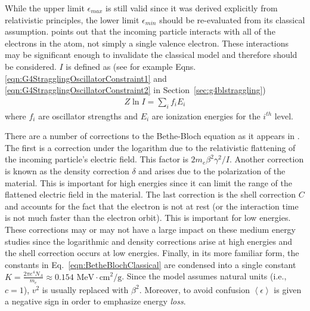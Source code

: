 While the upper limit $\epsilon_{max}$ is still valid since it was derived explicitly from relativistic principles, the lower limit $\epsilon_{min}$ should be re-evaluated from its classical assumption. \cite{bichsel1968} points out that the incoming particle interacts with all of the electrons in the atom, not simply a single valence electron. These interactions may be significant enough to invalidate the classical model and therefore should be considered. $I$ is defined as (see for example Eqns. \ref{eqn:G4StragglingOscillatorConstraint1} and \ref{eqn:G4StragglingOscillatorConstraint2} in Section~\ref{sec:g4blstraggling})
\begin{gather*}
Z \ln I = \sum_i f_i E_i
\end{gather*}
where $f_i$ are oscillator strengths and $E_i$ are ionization energies for the $i^{th}$ level.
\fi

There are a number of corrections to the Bethe-Bloch equation as it appears in \cite{cosy}. The first is a correction under the logarithm due to the relativistic flattening of the incoming particle's electric field. This factor is  $2m_e \beta^2 \gamma^2 / I$\cite{cosy}. Another correction is known as the density correction $\delta$ and arises due to the polarization of the material\cite{cosy}. This is important for high energies since it can limit the range of the flattened electric field in the material. The last correction is the shell correction $C$ and accounts for the fact that the electron is not at rest (or the interaction time is not much faster than the electron orbit)\cite{cosy}. This is important for low energies. These corrections may or may not have a large impact on these medium energy studies since the logarithmic and density corrections arise at high energies and the shell correction occurs at low energies. Finally, in its more familiar form, the constants in Eq.~\eqref{eqn:BetheBlochClassical} are condensed into a single constant $K=\frac{2\pi e^4 N_A}{m_e}\approx 0.154$ $ \text{MeV}\cdot \text{cm}^2/\text{g}$. Since the model assumes natural units (i.e., $c=1$), $v^2$ is usually replaced with $\beta ^2$. Moreover, to avoid confusion $\left<\epsilon\right>$ is given a negative sign in order to emphasize energy \emph{loss}.


